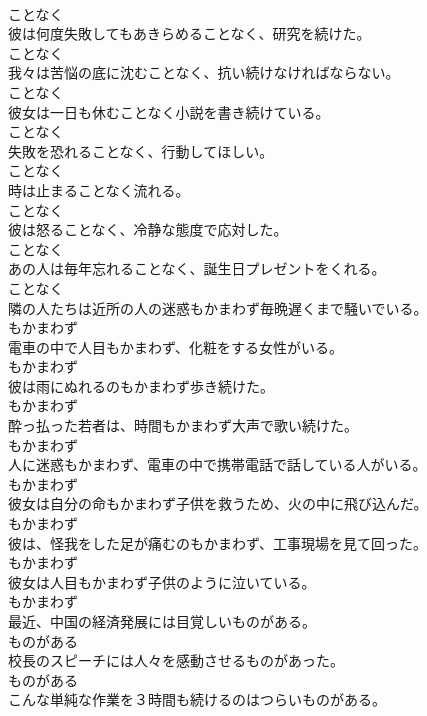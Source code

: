 \documentclass[8pt]{extreport}
\begin{document}
\begin{CJK}{UTF8}{min}
\\	ことなく
\\	彼は何度失敗してもあきらめることなく、研究を続けた。	
\\	ことなく
\\	我々は苦悩の底に沈むことなく、抗い続けなければならない。	
\\	ことなく
\\	彼女は一日も休むことなく小説を書き続けている。	
\\	ことなく
\\	失敗を恐れることなく、行動してほしい。	
\\	ことなく
\\	時は止まることなく流れる。	
\\	ことなく
\\	彼は怒ることなく、冷静な態度で応対した。	
\\	ことなく
\\	あの人は毎年忘れることなく、誕生日プレゼントをくれる。	
\\	ことなく
\\	隣の人たちは近所の人の迷惑もかまわず毎晩遅くまで騒いでいる。	
\\	もかまわず
\\	電車の中で人目もかまわず、化粧をする女性がいる。	
\\	もかまわず
\\	彼は雨にぬれるのもかまわず歩き続けた。	
\\	もかまわず
\\	酔っ払った若者は、時間もかまわず大声で歌い続けた。	
\\	もかまわず
\\	人に迷惑もかまわず、電車の中で携帯電話で話している人がいる。	
\\	もかまわず
\\	彼女は自分の命もかまわず子供を救うため、火の中に飛び込んだ。	
\\	もかまわず
\\	彼は、怪我をした足が痛むのもかまわず、工事現場を見て回った。	
\\	もかまわず
\\	彼女は人目もかまわず子供のように泣いている。	
\\	もかまわず
\\	最近、中国の経済発展には目覚しいものがある。	
\\	ものがある
\\	校長のスピーチには人々を感動させるものがあった。	
\\	ものがある
\\	こんな単純な作業を３時間も続けるのはつらいものがある。	

\end{CJK}
\end{document}
